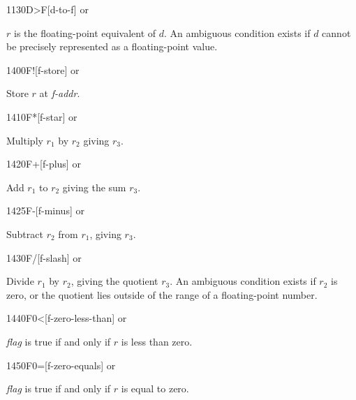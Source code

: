 \begin{newword}[DtoF]{1130}{D>F}[d-to-f]
	  or

	$r$ is the floating-point equivalent of $d$. An ambiguous
	condition exists if $d$ cannot be precisely represented as a
	floating-point value.
\end{newword}


\begin{newword}{1400}{F!}[f-store]
	  or

	Store $r$ at \emph{f-addr}.
\end{newword}


\begin{newword}{1410}{F*}[f-star]
	 or

	Multiply $r_1$ by $r_2$ giving $r_3$.
\end{newword}


\begin{newword}{1420}{F+}[f-plus]
	 or

	Add $r_1$ to $r_2$ giving the sum $r_3$.
\end{newword}


\begin{newword}{1425}{F-}[f-minus]
	 or

	Subtract $r_2$ from $r_1$, giving $r_3$.
\end{newword}


\begin{newword}{1430}{F/}[f-slash]
	 or

	Divide $r_1$ by $r_2$, giving the quotient $r_3$. An ambiguous
	condition exists if $r_2$ is zero, or the quotient lies outside
	of the range of a floating-point number.
\end{newword}


\begin{newword}[F0less]{1440}{F0<}[f-zero-less-than]
	  or

	\emph{flag} is true if and only if $r$ is less than zero.
\end{newword}


\begin{newword}{1450}{F0=}[f-zero-equals]
	  or

	\emph{flag} is true if and only if $r$ is equal to zero.
\end{newword}


